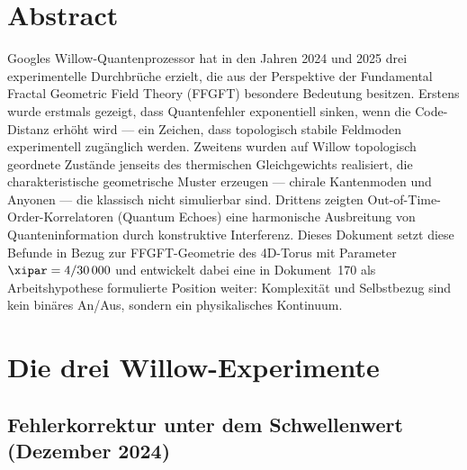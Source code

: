
\section*{Abstract}

Googles Willow-Quantenprozessor hat in den Jahren 2024 und 2025 drei experimentelle
Durchbrüche erzielt, die aus der Perspektive der Fundamental Fractal Geometric Field
Theory (FFGFT) besondere Bedeutung besitzen. Erstens wurde erstmals gezeigt, dass
Quantenfehler exponentiell sinken, wenn die Code-Distanz erhöht wird — ein
Zeichen, dass topologisch stabile Feldmoden experimentell zugänglich werden.
Zweitens wurden auf Willow topologisch geordnete Zustände jenseits des thermischen
Gleichgewichts realisiert, die charakteristische geometrische Muster erzeugen —
chirale Kantenmoden und Anyonen — die klassisch nicht simulierbar sind.
Drittens zeigten Out-of-Time-Order-Korrelatoren (Quantum Echoes) eine harmonische
Ausbreitung von Quanteninformation durch konstruktive Interferenz.
Dieses Dokument setzt diese Befunde in Bezug zur FFGFT-Geometrie des 4D-Torus
mit Parameter $\xipar = 4/30\,000$ und entwickelt dabei eine in Dokument~170
als Arbeitshypothese formulierte Position weiter: Komplexität und Selbstbezug
sind kein binäres An/Aus, sondern ein physikalisches Kontinuum.

\clearpage

\section{Die drei Willow-Experimente}

\subsection{Fehlerkorrektur unter dem Schwellenwert (Dezember 2024)}

